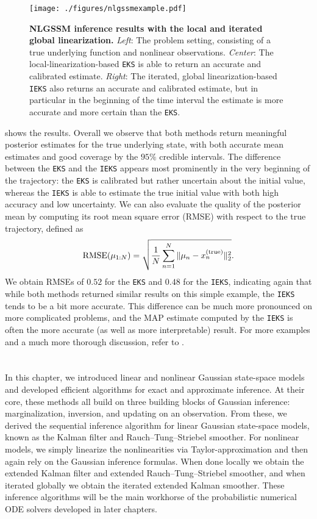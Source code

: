 \documentclass{mimosis}
\begin{document}
\begin{figure}[t]
\centering
\texttt{[image: ./figures/nlgssmexample.pdf]}
\caption{\label{fig:nlgssmexample}\textbf{NLGSSM inference results with the local and iterated global linearization.} \emph{Left}: The problem setting, consisting of a true underlying function and nonlinear observations. \emph{Center}: The local-linearization-based \texttt{EKS} is able to return an accurate and calibrated estimate. \emph{Right}: The iterated, global linearization-based \texttt{IEKS} also returns an accurate and calibrated estimate, but in particular in the beginning of the time interval the estimate is more accurate and more certain than the \texttt{EKS}.}
\end{figure}

 shows the results.
Overall we observe that both methods return meaningful posterior estimates for the true underlying state, with both accurate mean estimates and good coverage by the \(95\%\) credible intervals.
The difference between the \texttt{EKS} and the \texttt{IEKS} appears most prominently in the very beginning of the trajectory:
the \texttt{EKS} is calibrated but rather uncertain about the initial value,
whereas the \texttt{IEKS} is able to estimate the true initial value with both high accuracy and low uncertainty.
We can also evaluate the quality of the posterior mean by computing its root mean square error (RMSE) with respect to the true trajectory, defined as
\begin{equation}
  \operatorname{RMSE}(\mu_{1:N}) = \sqrt{\frac{1}{N} \sum_{n=1}^N \| \mu_{n}  - x_n^{\text{(true)}} \|_2^2}.
\end{equation}
We obtain RMSEs of \(0.52\) for the \texttt{EKS} and \(0.48\) for the \texttt{IEKS},
indicating again that while both methods returned similar results on this simple example, the \texttt{IEKS} tends to be a bit more accurate.
This difference can be much more pronounced on more complicated problems, and the MAP estimate computed by the \texttt{IEKS} is often the more accurate (as well as more interpretable) result.
For more examples and a much more thorough discussion, refer to
\textcite{Särkkä_Svensson_2023}.
\section{\wrapupsec{}}
\label{sec:org27bf838}
In this chapter, we introduced linear and nonlinear Gaussian state-space models and developed efficient algorithms for exact and approximate inference.
At their core, these methods all build on three building blocks of Gaussian inference: marginalization, inversion, and updating on an observation.
From these, we derived the sequential inference algorithm for linear Gaussian state-space models, known as the Kalman filter and Rauch--Tung--Striebel smoother.
For nonlinear models, we simply linearize the nonlinearities via Taylor-approximation and then again rely on the Gaussian inference formulas.
When done locally we obtain the extended Kalman filter and extended Rauch--Tung--Striebel smoother, and when iterated globally we obtain the iterated extended Kalman smoother.
These inference algorithms will be the main workhorse of the probabilistic numerical ODE solvers developed in later chapters.
\end{document}

